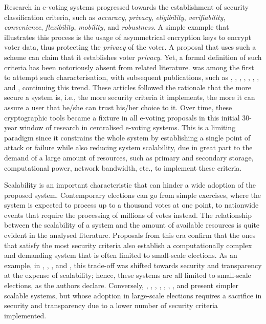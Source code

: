 \documentclass[../main.tex]{subfiles}
\begin{document}
Research in e-voting systems progressed towards the establishment of security classification criteria, such as \textit{accuracy}, \textit{privacy}, \textit{eligibility}, \textit{verifiability}, \textit{convenience}, \textit{flexibility}, \textit{mobility}, and \textit{robustness}. A simple example that illustrates this process is the usage of asymmetrical encryption keys to encrypt voter data, thus protecting the \textit{privacy} of the voter. A proposal that uses such a scheme can claim that it establishes voter \textit{privacy}. Yet, a formal definition of such criteria has been notoriously absent from related literature. \cite{Neumann1993} was among the first to attempt such characterisation, with subsequent publications, such as \cite{Fujioka1992}, \cite{Baraani1995}, \cite{Juang1997}, \cite{Ku1999}, \cite{Lee2000}, \cite{Joaquim2003}, \cite{Baiardi2005}, and \cite{Chaum2007}, continuing this trend. These articles followed the rationale that the more secure a system is, i.e., the more security criteria it implements, the more it can assure a user that he/she can trust his/her choice to it. Over time, these cryptographic tools became a fixture in all e-voting proposals in this initial 30-year window of research in centralised e-voting systems. This is a limiting paradigm since it constrains the whole system by establishing a single point of attack or failure while also reducing system scalability, due in great part to the demand of a large amount of resources, such as primary and secondary storage, computational power, network bandwidth, etc., to implement these criteria.
\par
Scalability is an important characteristic that can hinder a wide adoption of the proposed system. Contemporary elections can go from simple exercises, where the system is expected to process up to a thousand votes at one point, to nationwide events that require the processing of millions of votes instead. The relationship between the scalability of a system and the amount of available resources is quite evident in the analysed literature. Proposals from this era confirm that the ones that satisfy the most security criteria also establish a computationally complex and demanding system that is often limited to small-scale elections. As an example, in \cite{Cranor2002}, \cite{Nurmi1991}, \cite{Iversen1992}, and \cite{Niemi1999}, this trade-off was shifted towards security and transparency at the expense of scalability; hence, these systems are all limited to small-scale elections, as the authors declare. Conversely, \cite{Benaloh1994}, \cite{Benaloh1986a}, \cite{Park1994}, \cite{Juang2002}, \cite{Okamoto1996}, \cite{Okamoto1998}, \cite{Magkos2001}, and \cite{Moran2006} present simpler scalable systems, but whose adoption in large-scale elections requires a sacrifice in security and transparency due to a lower number of security criteria implemented.
\end{document}

